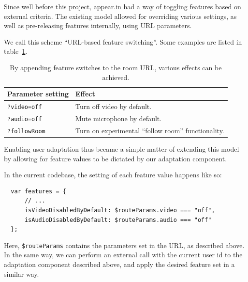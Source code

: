Since well before this project, appear.in had a way of toggling features based on external criteria. The existing model allowed for overriding various settings, as well as pre-releasing features internally, using URL parameters.

We call this scheme ``URL-based feature switching''. Some examples are listed in table~\ref{tab:feature_switches}.

\begin{table}[h]
  \centering
    \begin{tabular}{|l|l|}
      \hline
      Parameter setting    & Effect \\ \hline
      \texttt{?video=off}  & Turn off video by default. \\
      \texttt{?audio=off}  & Mute microphone by default. \\
      \texttt{?followRoom} & Turn on experimental ``follow room'' functionality. \\
      \hline
    \end{tabular}
  \caption{By appending feature switches to the room URL, various effects can be achieved.}
  \label{tab:feature_switches}
\end{table}

Enabling user adaptation thus became a simple matter of extending this model by allowing for feature values to be dictated by our adaptation component.

In the current codebase, the setting of each feature value happens like so:

\begin{verbatim}
  var features = {
      // ...
      isVideoDisabledByDefault: $routeParams.video === "off",
      isAudioDisabledByDefault: $routeParams.audio === "off"
  };
\end{verbatim}

Here, \verb|$routeParams| contains the parameters set in the URL, as described above. In the same way, we can perform an external call with the current user id to the adaptation component described above, and apply the desired feature set in a similar way.
